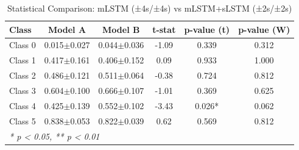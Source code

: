 \begin{table}[htbp]
\centering
\caption{Statistical Comparison: mLSTM (±4s/±4s) vs mLSTM+sLSTM (±2s/±2s)}
\label{tab:comparison_class_mlstm_±4s_±4s_vs_mlstmslstm_±2s_±2s}
\begin{tabular}{lccccc}
\toprule
\textbf{Class} & \textbf{Model A} & \textbf{Model B} & \textbf{t-stat} & \textbf{p-value (t)} & \textbf{p-value (W)} \\
\midrule
Class 0 & 0.015$\pm$0.027 & 0.044$\pm$0.036 & -1.09 & 0.339 & 0.312 \\
Class 1 & 0.417$\pm$0.161 & 0.406$\pm$0.152 & 0.09 & 0.933 & 1.000 \\
Class 2 & 0.486$\pm$0.121 & 0.511$\pm$0.064 & -0.38 & 0.724 & 0.812 \\
Class 3 & 0.604$\pm$0.100 & 0.666$\pm$0.107 & -1.01 & 0.369 & 0.625 \\
Class 4 & 0.425$\pm$0.139 & 0.552$\pm$0.102 & -3.43 & 0.026* & 0.062 \\
Class 5 & 0.838$\pm$0.053 & 0.822$\pm$0.039 & 0.62 & 0.569 & 0.812 \\
\bottomrule
\multicolumn{6}{l}{\textit{* p < 0.05, ** p < 0.01}} \\
\end{tabular}
\end{table}